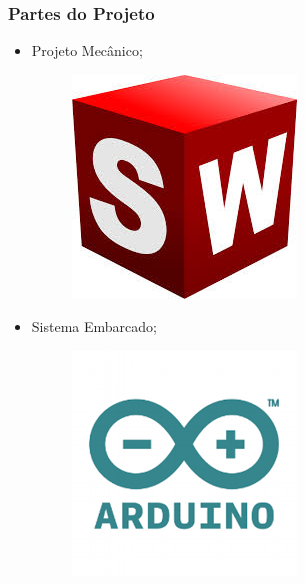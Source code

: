 \documentclass[hyperref={pdfpagelabels=false}]{beamer}
\begin{document}
             \begin{frame}\frametitle{Partes do Projeto}

                \begin{itemize}
                    \item Projeto Mecânico;
                        \begin{figure}
                            \includegraphics[scale=0.25]{Imagens/Ideia_de_projeto/sw.jpg}
                        \end{figure}
                    \item Sistema Embarcado;
                        \begin{figure}
                            \includegraphics[scale=0.3]{Imagens/Ideia_de_projeto/arduino.png}
                        \end{figure}
                \end{itemize}

            \end{frame}
\end{document}
